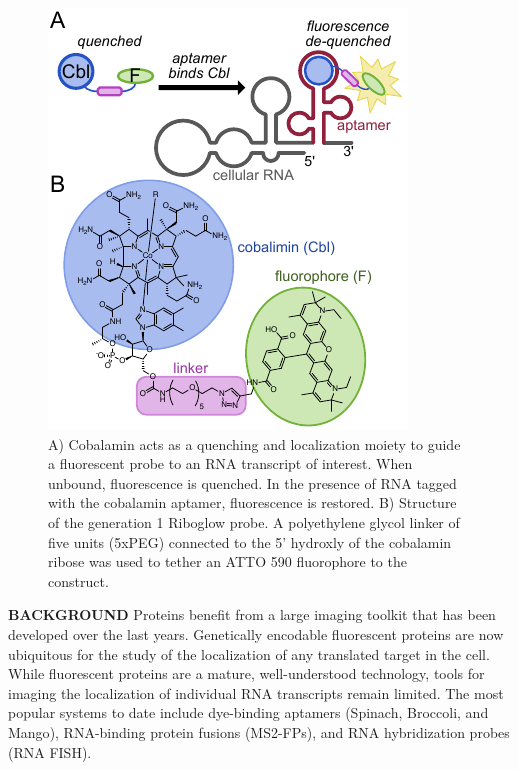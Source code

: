 \begin{figure}
\begin{centering}
\includegraphics[width=\textwidth]{figures/fig1v2.pdf}

\end{centering}
\footnotesize
\caption{\label{figure:riboglow}
A) Cobalamin acts as a quenching and localization moiety to guide a fluorescent probe to an RNA transcript of interest. When unbound, fluorescence is quenched. In the presence of RNA tagged with the cobalamin aptamer, fluorescence is restored. B) Structure of the generation 1 Riboglow probe. A polyethylene glycol linker of five units (5xPEG) connected to the 5' hydroxly of the cobalamin ribose was used to tether an ATTO 590 fluorophore to the construct.
}
\end{figure}

\textbf{BACKGROUND}
Proteins benefit from a large imaging toolkit that has been developed over the last  years. Genetically encodable fluorescent proteins are now ubiquitous for the study of the localization of any translated target in the cell. While fluorescent proteins are a mature, well-understood technology, tools for imaging the localization of individual RNA transcripts remain limited. The most popular systems to date include dye-binding aptamers (Spinach\cite{PaigeRNAMimicsGreen2011}, Broccoli\cite{FilonovBroccoliRapidSelection2014}, and Mango\cite{AutourFluorogenicRNAMango2018,DolgosheinaRNAMangoAptamerFluorophore2014}), RNA-binding protein fusions (MS2-FPs), and RNA hybridization probes (RNA FISH).

